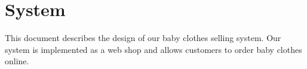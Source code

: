 \section{System}
This document describes the design of our baby clothes selling system. Our system is implemented as a web shop and allows customers to order baby clothes online. 